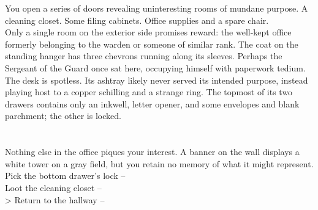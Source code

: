 You open a series of doors revealing uninteresting rooms of mundane purpose. A cleaning closet. Some filing cabinets. Office supplies and a spare chair.\\

Only a single room on the exterior side promises reward: the well-kept office formerly belonging to the warden or someone of similar rank. The coat on the standing hanger has three chevrons running along its sleeves. Perhaps the Sergeant of the Guard once sat here, occupying himself with paperwork tedium.\\

The desk is spotless. Its ashtray likely never served its intended purpose, instead playing host to a copper schilling and a strange ring. The topmost of its two drawers contains only an inkwell, letter opener, and some envelopes and blank parchment; the other is locked.\\
\\
\\

Nothing else in the office piques your interest. A banner on the wall displays a white tower on a gray field, but you retain no memory of what it might represent.\\

 Pick the bottom drawer's lock -- \\
 Loot the cleaning closet -- \\
> Return to the hallway -- 